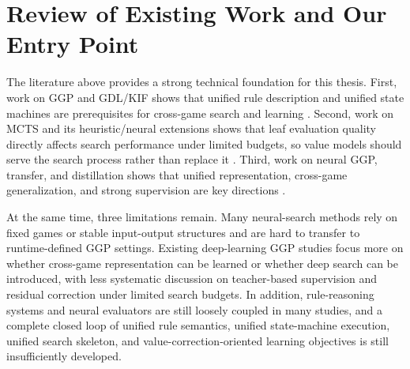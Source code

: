 
\section{Review of Existing Work and Our Entry Point}


The literature above provides a strong technical foundation for this thesis. First, work on GGP and GDL/KIF shows that unified rule description and unified state machines are prerequisites for cross-game search and learning \cite{genesereth2005general,thielscher2017gdl3,he2024qbf}. Second, work on MCTS and its heuristic/neural extensions shows that leaf evaluation quality directly affects search performance under limited budgets, so value models should serve the search process rather than replace it \cite{browne2012survey,finnsson2008simulation,liu2024efficient}. Third, work on neural GGP, transfer, and distillation shows that unified representation, cross-game generalization, and strong supervision are key directions \cite{mcewan2022knowledge,soemers2023transfer,partridge2022hidden,maras2024fast}.


At the same time, three limitations remain. Many neural-search methods rely on fixed games or stable input-output structures and are hard to transfer to runtime-defined GGP settings. Existing deep-learning GGP studies focus more on whether cross-game representation can be learned or whether deep search can be introduced, with less systematic discussion on teacher-based supervision and residual correction under limited search budgets. In addition, rule-reasoning systems and neural evaluators are still loosely coupled in many studies, and a complete closed loop of unified rule semantics, unified state-machine execution, unified search skeleton, and value-correction-oriented learning objectives is still insufficiently developed.

